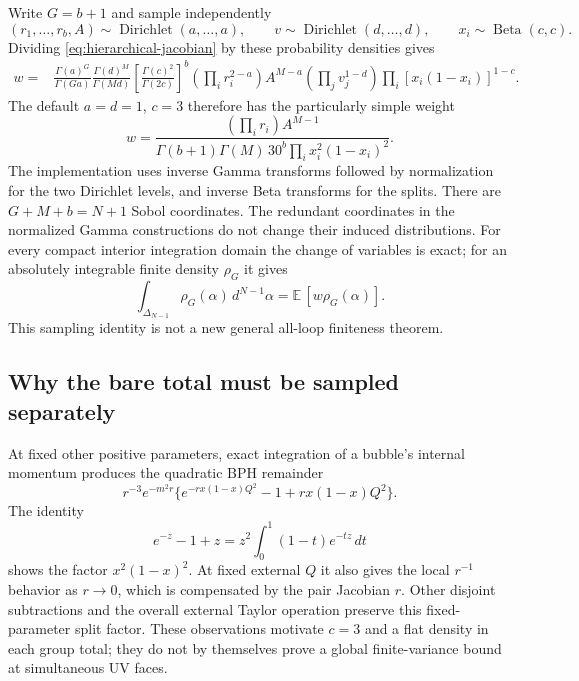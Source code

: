 Write $G=b+1$ and sample independently
\[
 (r_1,\ldots,r_b,A)\sim\operatorname{Dirichlet}(a,\ldots,a),
 \qquad v\sim\operatorname{Dirichlet}(d,\ldots,d),
 \qquad x_i\sim\operatorname{Beta}(c,c).
\]
Dividing \eqref{eq:hierarchical-jacobian} by these probability densities gives
\begin{align}
 w={}&\frac{\Gamma(a)^G}{\Gamma(Ga)}
       \frac{\Gamma(d)^M}{\Gamma(Md)}
       \left[\frac{\Gamma(c)^2}{\Gamma(2c)}\right]^b
       \left(\prod_i r_i^{2-a}\right) A^{M-a}
       \left(\prod_j v_j^{1-d}\right)
       \prod_i[x_i(1-x_i)]^{1-c}.
 \label{eq:hierarchical-general-weight}
\end{align}
The default $a=d=1$, $c=3$ therefore has the particularly simple weight
\begin{equation}
 \boxed{\displaystyle
 w=\frac{\left(\prod_i r_i\right)A^{M-1}}
 {\Gamma(b+1)\Gamma(M)\,30^b
  \prod_i x_i^2(1-x_i)^2}.}
 \label{eq:hierarchical-weight}
\end{equation}
The implementation uses inverse Gamma transforms followed by normalization
for the two Dirichlet levels, and inverse Beta transforms for the splits.
There are $G+M+b=N+1$ Sobol coordinates.  The redundant coordinates in the
normalized Gamma constructions do not change their induced distributions.
For every compact interior integration domain the change of variables is
exact; for an absolutely integrable finite density $\rho_G$ it gives
\[
 \int_{\Delta_{N-1}}\rho_G(\alpha)\,d^{N-1}\alpha
       =\mathbb E\,[w\rho_G(\alpha)].
\]
This sampling identity is not a new general all-loop finiteness theorem.

\subsection{Why the bare total must be sampled separately}

At fixed other positive parameters, exact integration of a bubble's
internal momentum produces the quadratic BPH remainder
\[
 r^{-3}e^{-m^2r}
 \{e^{-r x(1-x)Q^2}-1+r x(1-x)Q^2\}.
\]
The identity
\[
 e^{-z}-1+z=z^2\int_0^1(1-t)e^{-tz}\,dt
\]
shows the factor $x^2(1-x)^2$.  At fixed external $Q$ it also gives the
local $r^{-1}$ behavior as $r\to0$, which is compensated by the pair
Jacobian $r$.  Other disjoint subtractions and the overall external Taylor
operation preserve this fixed-parameter split factor.  These observations
motivate $c=3$ and a flat density in each group total; they do not by
themselves prove a global finite-variance bound at simultaneous UV faces.

